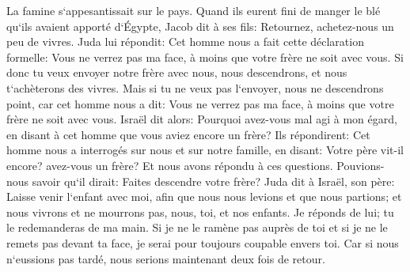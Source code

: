\verse La famine s`appesantissait sur le pays. 
\verse Quand ils eurent fini de manger le blé qu`ils avaient apporté d`Égypte, Jacob dit à ses fils: Retournez, achetez-nous un peu de vivres. 
\verse Juda lui répondit: Cet homme nous a fait cette déclaration formelle: Vous ne verrez pas ma face, à moins que votre frère ne soit avec vous. 
\verse Si donc tu veux envoyer notre frère avec nous, nous descendrons, et nous t`achèterons des vivres. 
\verse Mais si tu ne veux pas l`envoyer, nous ne descendrons point, car cet homme nous a dit: Vous ne verrez pas ma face, à moins que votre frère ne soit avec vous. 
\verse Israël dit alors: Pourquoi avez-vous mal agi à mon égard, en disant à cet homme que vous aviez encore un frère? 
\verse Ils répondirent: Cet homme nous a interrogés sur nous et sur notre famille, en disant: Votre père vit-il encore? avez-vous un frère? Et nous avons répondu à ces questions. Pouvions-nous savoir qu`il dirait: Faites descendre votre frère? 
\verse Juda dit à Israël, son père: Laisse venir l`enfant avec moi, afin que nous nous levions et que nous partions; et nous vivrons et ne mourrons pas, nous, toi, et nos enfants. 
\verse Je réponds de lui; tu le redemanderas de ma main. Si je ne le ramène pas auprès de toi et si je ne le remets pas devant ta face, je serai pour toujours coupable envers toi. 
\verse Car si nous n`eussions pas tardé, nous serions maintenant deux fois de retour. 
